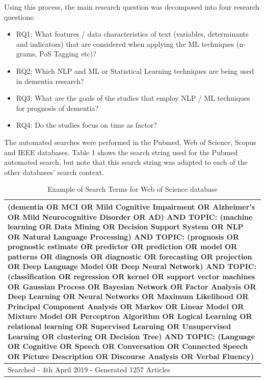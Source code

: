 \documentclass[10pt, letterpaper, twoside, openany]{thesis}
\begin{document}
Using this process, the main research question was decomposed  into four research questions:
\begin{itemize}
	\item RQ1: What features / data characteristics of text (variables, determinants and indicators) that are considered when applying the ML techniques (n-grams, PoS Tagging etc)?
	\item RQ2: Which NLP and ML or Statistical Learning techniques are being used in dementia research?
	\item RQ3: What are the goals of the studies that employ NLP / ML techniques for prognosis of dementia?
	\item RQ4: Do the studies focus on time as factor?
\end{itemize}
\par 
The automated searches were performed in the Pubmed, Web of Science, Scopus and IEEE databases. Table 1 shows the search string used for the Pubmed automated search, but note that this search string was adapted to each of the other databases’ search context.

\begin{table}[H]
	\begin{center}
	\begin{tabular}{ | p{12cm} | }
	\hline
	(dementia OR MCI OR Mild Cognitive Impairment OR Alzheimer's OR Mild Neurocognitive Disorder OR AD) AND TOPIC: (machine learning OR Data Mining OR Decision Support System OR NLP OR Natural 			Language Processing) AND TOPIC: (prognosis OR prognostic estimate OR predictor OR prediction OR model OR patterns OR diagnosis OR diagnostic OR forecasting OR projection OR Deep Language Model 		OR Deep Neural Network) AND TOPIC: (classification OR regression OR kernel OR support vector machines OR Gaussian Process OR Bayesian Network OR Factor Analysis OR Deep Learning OR Neural 			Networks OR Maximum Likelihood OR Principal Component Analysis OR Markov OR Linear Model OR Mixture Model OR Perceptron Algorithm OR Logical Learning OR relational learning OR Supervised 				Learning OR Unsupervised Learning OR clustering OR Decision Tree) AND TOPIC: (Language OR Cognitive OR Speech OR Conversation OR Connected Speech OR Picture Description OR Discourse Analysis OR 		Verbal Fluency)  \\ \hline
	Searched - 4th April 2019 - Generated 1257 Articles \\
	\hline
	\end{tabular}
	\end{center}
	\caption[Table caption text]{Example of Search Terms for Web of Science database}
	\label{table:name}
\end{table}
\end{document}
